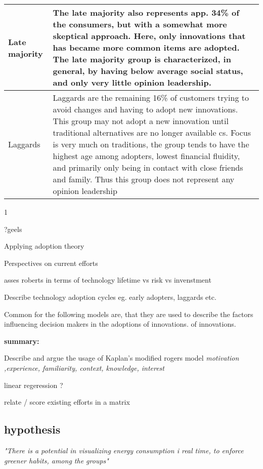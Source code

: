 \documentclass[journal]{IEEEtran}
\begin{document}
\begin{table}[ht]
\begin{tabular}{|p{2cm} |p{5.5cm}|}
Late majority & 
The late majority also represents app. 34\% of the consumers\cite{diffusion2}, but with a somewhat more skeptical approach. Here, only innovations that has became more common items are adopted. The late majority group is characterized, in general, by having below average social status, and only very little opinion leadership\cite{rogers_model}.\\
\hline

Laggards & 
Laggards are the remaining 16\% of customers trying to avoid changes and having to adopt new innovations. This group may not adopt a new innovation until traditional alternatives are no longer available  cs\cite{diffusion2}. Focus is very much on traditions, the group tends to have the highest age among adopters, lowest financial fluidity, and primarily only being in contact with close friends and family. Thus this group does not represent any opinion leadership\cite{rogers_model} \\ 
\hline

\end{tabular}
\label{table:rogers_char} %
1\end{table}



?geels 


Applying adoption theory

Perspectives on current efforts

asses roberts in terms of technology lifetime vs risk vs invenstment


Describe technology adoption cycles eg. early adopters, laggards etc.

Common for the following models are, that they are used to describe the factors influencing decision makers in the adoptions of innovations.
of innovations.



\textbf{summary:}

Describe and argue the usage of Kaplan's modified rogers model
\textit{motivation ,experience, familiarity, context, knowledge, interest}

linear regeression ?

relate / score existing efforts in a matrix

\subsection{hypothesis}
\textit{"There is a potential in visualizing energy consumption i real time, to enforce greener habits, among the groups"}
\end{document}
